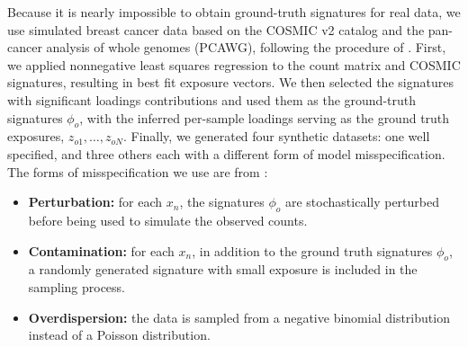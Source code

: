 Because it is nearly impossible to obtain ground-truth signatures for real data, we use
simulated breast cancer data
based on the COSMIC v2 catalog and the pan-cancer analysis of whole genomes (PCAWG),
following the procedure of \citet{Xue:2024}.
First, we applied nonnegative least squares regression to the count matrix and COSMIC signatures, resulting in best fit exposure vectors.
We then selected the signatures with significant loadings contributions and used them as the ground-truth signatures ${\phi}_{o}$, with
the inferred per-sample loadings serving as the ground truth exposures,
$z_{o 1}, \dots, z_{o N}$.
Finally, we generated four synthetic datasets: one well specified, and three others each with a different form of model misspecification.
The forms of misspecification we use are from \citet{Xue:2024}:
\begin{itemize}
	\item \textbf{Perturbation:} for each ${x}_{n}$, the signatures ${\phi}_{o}$ are stochastically perturbed
	      before being used to simulate the observed counts.
	\item \textbf{Contamination:} for each ${x}_{n}$, in addition to the ground truth signatures ${\phi}_{o}$,
	      a randomly generated signature with small exposure is included in the sampling process.
	\item \textbf{Overdispersion:} the data is sampled from a negative binomial distribution instead of a Poisson distribution.
\end{itemize}


